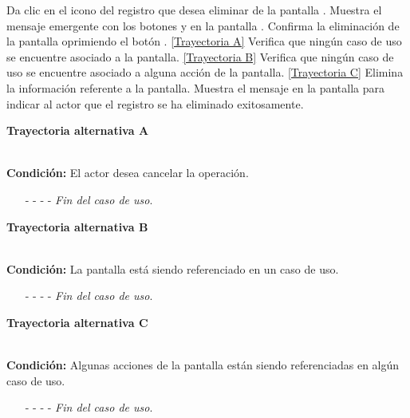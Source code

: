 	\begin{UCtrayectoria}
		\UCpaso[\UCactor] Da clic en el icono \eliminar del registro que desea eliminar de la pantalla .
		\UCpaso[\UCsist] Muestra el mensaje emergente  con los botones  y  en la pantalla .
		\UCpaso[\UCactor] Confirma la eliminación de la pantalla oprimiendo el botón . \hyperlink{CU11-3:TAA}{[Trayectoria A]}
		\UCpaso[\UCsist] Verifica que ningún caso de uso se encuentre asociado a la pantalla. \hyperlink{CU11-3:TAB}{[Trayectoria B]}
		\UCpaso[\UCsist] Verifica que ningún caso de uso se encuentre asociado a alguna acción de la pantalla. \hyperlink{CU11-3:TAC}{[Trayectoria C]}
		\UCpaso[\UCsist] Elimina la información referente a la pantalla.
		\UCpaso[\UCsist] Muestra el mensaje  en la pantalla  para indicar al actor que el registro se ha eliminado exitosamente.
	\end{UCtrayectoria}		
\hypertarget{CU11-3:TAA}{\textbf{Trayectoria alternativa A}}\\
\noindent \textbf{Condición:} El actor desea cancelar la operación.
\begin{enumerate}
	\UCpaso[\UCactor] Oprime el botón  de la pantalla emergente.
	\UCpaso[\UCsist] Muestra la pantalla .
	\item[- -] - - {\em {Fin del caso de uso}}.%
\end{enumerate}		
\hypertarget{CU11-3:TAB}{\textbf{Trayectoria alternativa B}}\\
\noindent \textbf{Condición:} La pantalla está siendo referenciado en un caso de uso.
\begin{enumerate}
	\UCpaso[\UCsist] Muestra el mensaje  en la pantalla .
	\item[- -] - - {\em {Fin del caso de uso}}.
\end{enumerate}
\hypertarget{CU11-3:TAC}{\textbf{Trayectoria alternativa C}}\\
\noindent \textbf{Condición:} Algunas acciones de la pantalla están siendo referenciadas en algún caso de uso.
\begin{enumerate}
	\UCpaso[\UCsist] Muestra el mensaje  en la pantalla .
	\item[- -] - - {\em {Fin del caso de uso}}.
\end{enumerate}
	

